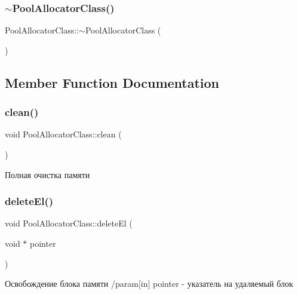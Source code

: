 \subsubsection{\texorpdfstring{$\sim$\+Pool\+Allocator\+Class()}{~PoolAllocatorClass()}}
{\footnotesize\ttfamily Pool\+Allocator\+Class\+::$\sim$\+Pool\+Allocator\+Class (\begin{DoxyParamCaption}{ }\end{DoxyParamCaption})}



\subsection{Member Function Documentation}
\mbox{\label{class_pool_allocator_class_a23eb2eae3369c410ee6a2dbd09beea23}} 
\subsubsection{\texorpdfstring{clean()}{clean()}}
{\footnotesize\ttfamily void Pool\+Allocator\+Class\+::clean (\begin{DoxyParamCaption}{ }\end{DoxyParamCaption})}



Полная очистка памяти 

\mbox{\label{class_pool_allocator_class_a5749639bd047a54ef2bf39348c3ed912}} 
\subsubsection{\texorpdfstring{delete\+El()}{deleteEl()}}
{\footnotesize\ttfamily void Pool\+Allocator\+Class\+::delete\+El (\begin{DoxyParamCaption}\item[{void $\ast$}]{pointer }\end{DoxyParamCaption})}



Освобождение блока памяти /param\mbox{[}in\mbox{]} pointer -\/ указатель на удаляемый блок 

